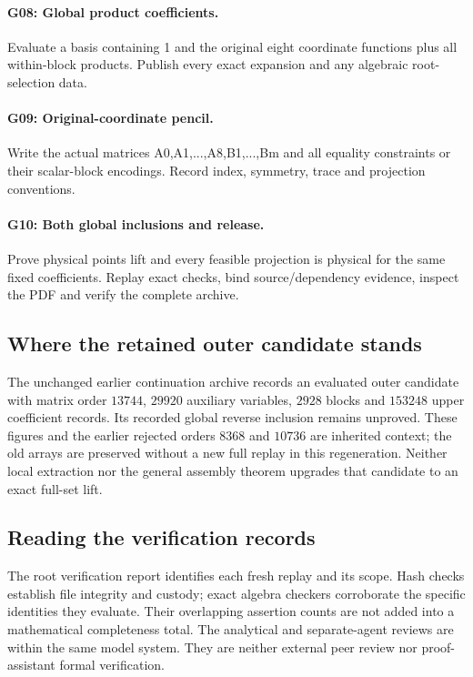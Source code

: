 \paragraph{G08: Global product coefficients.} Evaluate a basis containing 1 and the original eight coordinate functions plus all within-block products. Publish every exact expansion and any algebraic root-selection data.
\paragraph{G09: Original-coordinate pencil.} Write the actual matrices A0,A1,...,A8,B1,...,Bm and all equality constraints or their scalar-block encodings. Record index, symmetry, trace and projection conventions.
\paragraph{G10: Both global inclusions and release.} Prove physical points lift and every feasible projection is physical for the same fixed coefficients. Replay exact checks, bind source/dependency evidence, inspect the PDF and verify the complete archive.
\subsection{Where the retained outer candidate stands}
The unchanged earlier continuation archive records an evaluated outer candidate with matrix order $13744$, $29920$ auxiliary variables, $2928$ blocks and $153248$ upper coefficient records. Its recorded global reverse inclusion remains unproved. These figures and the earlier rejected orders $8368$ and $10736$ are inherited context; the old arrays are preserved without a new full replay in this regeneration. Neither local extraction nor the general assembly theorem upgrades that candidate to an exact full-set lift.
\subsection{Reading the verification records}
The root verification report identifies each fresh replay and its scope. Hash checks establish file integrity and custody; exact algebra checkers corroborate the specific identities they evaluate. Their overlapping assertion counts are not added into a mathematical completeness total. The analytical and separate-agent reviews are within the same model system. They are neither external peer review nor proof-assistant formal verification.
